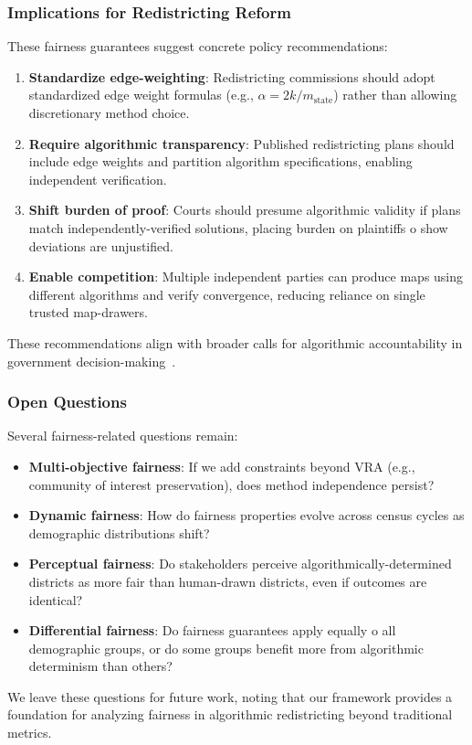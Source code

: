 \subsubsection{Implications for Redistricting Reform}

These fairness guarantees suggest concrete policy recommendations:

\begin{enumerate}
    \item \textbf{Standardize edge-weighting}: Redistricting commissions should adopt standardized edge weight formulas (e.g., $\alpha = 2k / m_{\text{state}}$) rather than allowing discretionary method choice.

    \item \textbf{Require algorithmic transparency}: Published redistricting plans should include edge weights and partition algorithm specifications, enabling independent verification.

    \item \textbf{Shift burden of proof}: Courts should presume algorithmic validity if plans match independently-verified solutions, placing burden on plaintiffs 	o show deviations are unjustified.

    \item \textbf{Enable competition}: Multiple independent parties can produce maps using different algorithms and verify convergence, reducing reliance on single trusted map-drawers.
\end{enumerate}

These recommendations align with broader calls for algorithmic accountability in government decision-making~\cite{kroll2017accountable,citron2008technological,brauneis2018algorithmic}.

\subsubsection{Open Questions}

Several fairness-related questions remain:

\begin{itemize}
    \item \textbf{Multi-objective fairness}: If we add constraints beyond VRA (e.g., community of interest preservation), does method independence persist?

    \item \textbf{Dynamic fairness}: How do fairness properties evolve across census cycles as demographic distributions shift?

    \item \textbf{Perceptual fairness}: Do stakeholders perceive algorithmically-determined districts as more fair than human-drawn districts, even if outcomes are identical?

    \item \textbf{Differential fairness}: Do fairness guarantees apply equally 	o all demographic groups, or do some groups benefit more from algorithmic determinism than others?
\end{itemize}

We leave these questions for future work, noting that our framework provides a foundation for analyzing fairness in algorithmic redistricting beyond traditional metrics.

